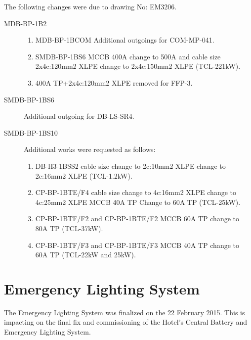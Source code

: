 The following changes were due to drawing No: EM3206.
\begin{description}
\item[MDB-BP-1B2] 
    \begin{enumerate}
       \item MDB-BP-1BCOM Additional outgoings for COM-MP-041.
       \item SMDB-BP-1BS6 MCCB 400A change to 500A and cable size 2x4c:120mm2 XLPE change to 2x4c:150mm2 XLPE (TCL-221kW).
       \item 400A TP+2x4c:120mm2 XLPE removed for FFP-3.
    \end{enumerate}
\item[SMDB-BP-1BS6] Additional outgoing for DB-LS-SR4.
\item[SMDB-BP-1BS10] Additional works were requested as follows:
    \begin{enumerate}
      \item DB-H3-1BSS2 cable size change to 2c:10mm2 XLPE change to 2c:16mm2 XLPE (TCL-1.2kW).
      \item CP-BP-1BTE/F4 cable size change to 4c:16mm2 XLPE change to 4c:25mm2 XLPE MCCB 40A TP Change to 60A TP (TCL-25kW).
      \item CP-BP-1BTF/F2 and CP-BP-1BTE/F2 MCCB 60A TP change to 80A TP (TCL-37kW).
      \item CP-BP-1BTF/F3 and CP-BP-1BTE/F3 MCCB 40A TP change to 60A TP (TCL-22kW and 25kW).
    \end{enumerate}
\end{description}


\chapter{Emergency Lighting System}
\label{emergencylights}
The Emergency Lighting System was finalized on the 22 February 2015. This is impacting on the final fix and commissioning of the Hotel’s Central Battery and Emergency Lighting System. 

